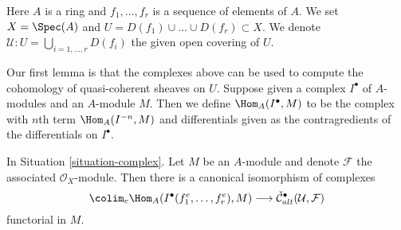 \begin{situation}
\label{situation-complex}
Here $A$ is a ring and $f_1, \ldots, f_r$ is a sequence of elements of $A$.
We set $X = \Spec(A)$ and $U = D(f_1) \cup \ldots \cup D(f_r) \subset X$.
We denote $\mathcal{U} : U = \bigcup_{i = 1, \ldots, r} D(f_i)$ the
given open covering of $U$.
\end{situation}

\noindent
Our first lemma is that the complexes above can be used to compute
the cohomology of quasi-coherent sheaves on $U$. Suppose given a
complex $I^\bullet$ of $A$-modules and an $A$-module $M$. Then we
define $\Hom_A(I^\bullet, M)$ to be the complex with $n$th
term $\Hom_A(I^{-n}, M)$ and differentials given as the contragredients
of the differentials on $I^\bullet$.

\begin{lemma}
\label{lemma-alternating-cech-complex}
In Situation \ref{situation-complex}. Let $M$ be an $A$-module and
denote $\mathcal{F}$ the associated $\mathcal{O}_X$-module. Then
there is a canonical isomorphism of complexes
$$
\colim_e \Hom_A(I^\bullet(f_1^e, \ldots, f_r^e), M)
\longrightarrow
\check{\mathcal{C}}_{alt}^\bullet(\mathcal{U}, \mathcal{F})
$$
functorial in $M$.
\end{lemma}

